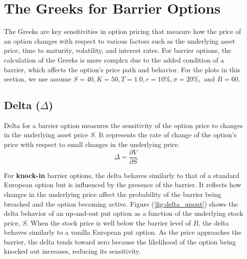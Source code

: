 \chapter{The Greeks for Barrier Options}
\label{sec:greeks}

The Greeks are key sensitivities in option pricing that measure how the price of an option changes with respect to various factors such as the underlying asset price, time to maturity, volatility, and interest rates. For barrier options, the calculation of the Greeks is more complex due to the added condition of a barrier, which affects the option's price path and behavior. For the plots in this section, we use assume $S = 40 , K = 50, T = 1.0, r = 10\%, \sigma = 20\%, \text{ and } B = 60$.

\section{Delta (\(\Delta\))}

Delta for a barrier option measures the sensitivity of the option price to changes in the underlying asset price $S$. It represents the rate of change of the option's price with respect to small changes in the underlying price.
\[
\Delta = \frac{\partial V}{\partial S}
\]

For \textbf{knock-in} barrier options, the delta behaves similarly to that of a standard European option but is influenced by the presence of the barrier. It reflects how changes in the underlying price affect the probability of the barrier being breached and the option becoming active. Figure (\ref{fig:delta_upout}) shows the delta behavior of an up-and-out put option as a function of the underlying stock price, $S$. When the stock price is well below the barrier level of $B$, the delta behaves similarly to a vanilla European put option. As the price approaches the barrier, the delta tends toward zero because the likelihood of the option being knocked out increases, reducing its sensitivity.

